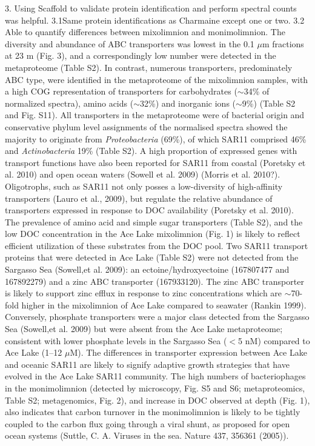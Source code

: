 3. Using Scaffold to validate protein identification and perform spectral counts was helpful. 
3.1Same protein identifications as Charmaine except one or two.
3.2 Able to quantify differences between mixolimnion and monimolimnion.
The diversity and abundance of \ac{ABC} transporters was lowest in the 0.1 $\mu$m fractions at 23 m (Fig. 3), and a correspondingly low number were detected in the metaproteome (Table S2). 
In contrast, numerous transporters, predominately \ac{ABC} type, were identified in the metaproteome of the mixolimnion samples, with a high \ac{COG} representation of transporters for carbohydrates ($\sim$34\% of normalized spectra), amino acids ($\sim$32\%) and inorganic ions ($\sim$9\%) (Table S2 and Fig. S11).
All transporters in the metaproteome were of bacterial origin and conservative phylum level assignments of the normalised spectra showed the majority to originate from \emph{Proteobacteria} (69\%), 
of which SAR11 comprised 46\% and \emph{Actinobacteria} 19\% (Table S2). 
A high proportion of expressed genes with transport functions have also been reported for SAR11 from coastal (Poretsky et al. 2010) and open ocean waters (Sowell et al. 2009) (Morris et al. 2010?). 
Oligotrophs, such as SAR11 not only posses a low-diversity of high-affinity transporters (Lauro et al., 2009), but regulate the relative abundance of transporters expressed in response to \ac{DOC} availability (Poretsky et al. 2010). 
The prevalence of amino acid and simple sugar transporters (Table S2), and the low \ac{DOC} concentration in the Ace Lake mixolimnion (Fig. 1) is likely to reflect efficient utilization of these substrates from the \ac{DOC} pool. 
Two SAR11 transport proteins that were detected in Ace Lake (Table S2) were not detected from the Sargasso Sea (Sowell,et al. 2009): an ectoine/hydroxyectoine (167807477 and 167892279) and a zinc \ac{ABC} transporter (167933120). The zinc \ac{ABC} transporter is likely to support zinc efflux in response to zinc concentrations which are $\sim$70-fold higher in the mixolimnion of Ace Lake compared to seawater (Rankin 1999). 
Conversely, phosphate transporters were a major class detected from the Sargasso Sea (Sowell,et al. 2009) but were absent from the Ace Lake metaproteome; consistent with lower phosphate levels in the Sargasso Sea ($<$5 nM) compared to Ace Lake (1--12 $\mu$M). The differences in transporter expression between Ace Lake and oceanic SAR11 are likely to signify adaptive growth strategies that have evolved in the Ace Lake SAR11 community.
The high numbers of bacteriophages in the monimolimnion (detected by microscopy, Fig. S5 and S6; metaproteomics, Table S2; metagenomics, Fig. 2), and increase in \ac{DOC} observed at depth (Fig. 1), also indicates that carbon turnover in the monimolimnion is likely to be tightly coupled to the carbon flux going through a viral shunt, as proposed for open ocean systems (Suttle, C. A. Viruses in the sea. Nature 437, 356361 (2005)). 
